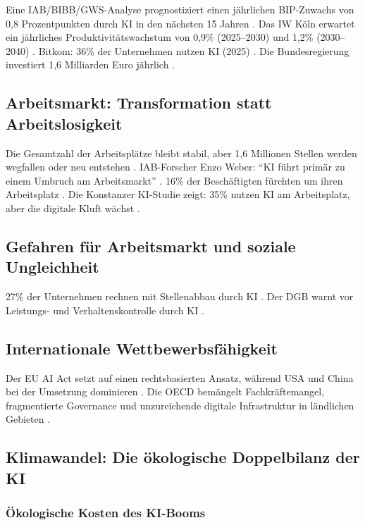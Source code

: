 \documentclass[12pt,a4paper]{article}
\begin{document}
	Eine IAB/BIBB/GWS-Analyse prognostiziert einen jährlichen BIP-Zuwachs von 0,8 Prozentpunkten durch KI in den nächsten 15 Jahren \cite{IAB2025a}. Das IW Köln erwartet ein jährliches Produktivitätswachstum von 0,9\% (2025–2030) und 1,2\% (2030–2040) \cite{IW2025}. Bitkom: 36\% der Unternehmen nutzen KI (2025) \cite{Bitkom2025}. Die Bundesregierung investiert 1,6 Milliarden Euro jährlich \cite{Vention2025}.
	
	\subsection{Arbeitsmarkt: Transformation statt Arbeitslosigkeit}
	
	Die Gesamtzahl der Arbeitsplätze bleibt stabil, aber 1,6 Millionen Stellen werden wegfallen oder neu entstehen \cite{IAB2025a}. IAB-Forscher Enzo Weber: \enquote{KI führt primär zu einem Umbruch am Arbeitsmarkt} \cite{IAB2025a}. 16\% der Beschäftigten fürchten um ihren Arbeitsplatz \cite{XING2025}. Die Konstanzer KI-Studie zeigt: 35\% nutzen KI am Arbeitsplatz, aber die digitale Kluft wächst \cite{Konstanz2025}.
	
	\subsection{Gefahren für Arbeitsmarkt und soziale Ungleichheit}
	
	27\% der Unternehmen rechnen mit Stellenabbau durch KI \cite{ifo2025}. Der DGB warnt vor Leistungs- und Verhaltenskontrolle durch KI \cite{DGB2025}.
	
	\subsection{Internationale Wettbewerbsfähigkeit}
	
	Der EU AI Act setzt auf einen rechtsbasierten Ansatz, während USA und China bei der Umsetzung dominieren \cite{GlobalAI2025}. Die OECD bemängelt Fachkräftemangel, fragmentierte Governance und unzureichende digitale Infrastruktur in ländlichen Gebieten \cite{OECD2025}.
	
	\subsection{Klimawandel: Die ökologische Doppelbilanz der KI}
	
	\subsubsection{Ökologische Kosten des KI-Booms}
	
\end{document}
